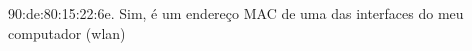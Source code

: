 
\begin{solution}
    90:de:80:15:22:6e. Sim, é um endereço MAC de uma das interfaces do meu computador (wlan)
\end{solution}